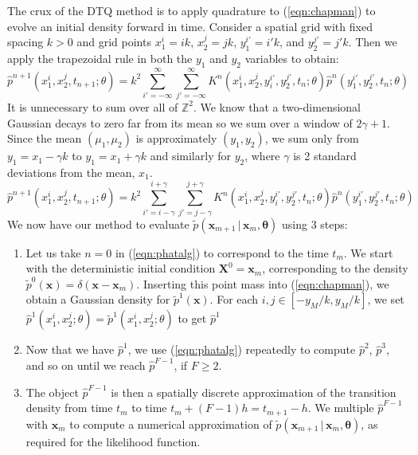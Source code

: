 \documentclass[graybox]{svmult}
\newcommand{\btheta}{\ensuremath{\boldsymbol{\theta}}}
\begin{document}
The crux of the DTQ method is to apply quadrature to (\ref{eqn:chapman}) to evolve an initial density forward in time.  Consider a spatial grid with fixed spacing $k > 0$ and grid points $x_1^i = ik$, $x_2^j = jk$, $y_1^{i'} = i'k$, and $y_2^{j'} = j'k$.  Then we apply the trapezoidal rule in both the $y_1$ and $y_2$ variables to obtain:
\begin{equation}
\hat{p}^{n+1}(x_1^i, x_2^j, t_{n+1};\theta) = k^2 \sum\limits_{i' = -\infty}^{\infty} \sum\limits_{j' = -\infty}^{\infty} K^n(x_1^i, x_2^j, y_i^{i'}, y_2^{j'},t_n; \theta) \hat{p}^n(y_1^{i'}, y_2^{j'},t_n; \theta)
\end{equation}
It is unnecessary to sum over all of $\mathbb{Z}^2$.  We know that a two-dimensional Gaussian decays to zero far from its mean so we sum over a window of $2 \gamma +1$.  Since the mean $(\mu_1,\mu_2)$ is approximately $(y_1,y_2)$, we sum only from $y_1 = x_1 - \gamma k$ to $y_1 = x_1 + \gamma k$ and similarly for $y_2$, where $\gamma$ is 2 standard deviations from the mean, $x_1$.
\begin{equation}
\label{eqn:phatalg}
\hat{p}^{n+1}(x_1^i, x_2^j, t_{n+1};\theta ) = k^2 \sum\limits_{i' = i - \gamma}^{i+ \gamma} \sum\limits_{j' = j-\gamma}^{j+\gamma} K^n(x_1^i, x_2^j, y_i^{i'}, y_2^{j'}, t_n; \theta) \hat{p}^n(y_1^{i'}, y_2^{j'}, t_n; \theta)
\end{equation}
We now have our method to evaluate $\widetilde{p}(\mathbf{x}_{m+1} \, | \, \mathbf{x}_m, \btheta)$ using 3 steps:

\begin{enumerate}
\item Let us take $n=0$ in (\ref{eqn:phatalg}) to correspond to the time $t_m$.  We start with the deterministic initial condition $\mathbf{X}^0 = \mathbf{x}_m$, corresponding to the density $\widetilde{p}^0(\mathbf{x}) = \delta(\mathbf{x} - \mathbf{x}_m)$.  Inserting this point mass into (\ref{eqn:chapman}), we obtain a Gaussian density for $\widetilde{p}^1(\mathbf{x})$.  For each $i,j \in [-y_M/k, y_M/k]$, we set $ \hat{p}^1(x_1^i, x_2^j; \theta) = \widetilde{p}^1(x_1^i, x_2^j; \theta)$
to get $\hat{p}^1$
\item Now that we have $\hat{p}^1$, we use (\ref{eqn:phatalg}) repeatedly to compute $\hat{p}^2$, $\hat{p}^3$, and so on until we reach $\hat{p}^{F-1}$, if $F \geq 2$. 
\item The object $\hat{p}^{F-1}$ is then a spatially discrete approximation of the transition density from time $t_m$ to time $t_m + (F-1)h = t_{m+1} - h$.  We multiple $\hat{p}^{F-1}$ with $\mathbf{x}_m$ to compute a numerical approximation of $\widetilde{p}(\mathbf{x}_{m+1} \, | \, \mathbf{x}_m, \btheta)$, as required for the likelihood function.
\end{enumerate}
\end{document}
